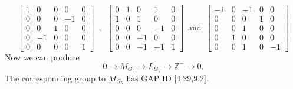 \documentclass{article}
\theoremstyle{plain}
\theoremstyle{definition}
\newcommand{\Z}{\ensuremath{\mathbb{Z}}}
\newcommand{\tand}{\ensuremath{\,\,\, \text{and} \,\,\,}}
\newcommand{\exactseqs}[1]{\ensuremath{0 \longrightarrow M_{#1} \longrightarrow L_{#1} \longrightarrow \Z^{-} \longrightarrow 0}}
\begin{document}
$$
\left[ \begin {array}{cccc|c} 1&0&0&0&0\\0&0&0&-1&0
\\0&0&1&0&0\\0&-1&0&0&0
\\ \hline 0&0&0&0&1\end {array} \right] 
\,\,\, , \,\,\,
 \left[ \begin {array}{cccc|c} 0&1&0&1&0\\1&0&1&0&0
\\0&0&0&-1&0\\0&0&-1&0&0
\\ \hline 0&0&-1&-1&1\end {array} \right] 
\tand
 \left[ \begin {array}{cccc|c} -1&0&-1&0&0\\0&0&0&1&0
\\0&0&1&0&0\\0&1&0&0&0
\\ \hline 0&0&1&0&-1\end {array} \right] 
$$
Now we can produce
$$
\exactseqs{G_5}
.$$
The corresponding group to $M_{G_5}$ has GAP ID [4,29,9,2]. 
\end{document}
